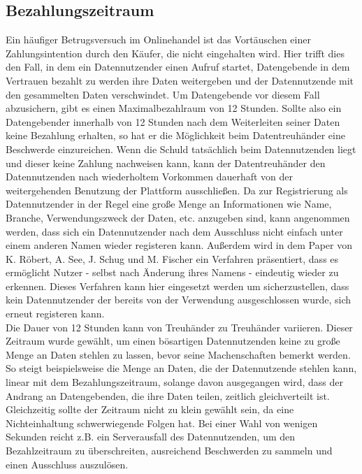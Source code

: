 \documentclass{scrreprt}
\begin{document}
\subsection{Bezahlungszeitraum}
\label{subsec:paymentTimespan}
Ein häufiger Betrugsversuch im Onlinehandel ist das Vortäuschen einer Zahlungsintention durch den Käufer, die nicht eingehalten wird. Hier trifft dies den Fall, in dem ein Datennutzender einen Aufruf startet, Datengebende in dem Vertrauen bezahlt zu werden ihre Daten weitergeben und der Datennutzende mit den gesammelten Daten verschwindet. Um Datengebende vor diesem Fall abzusichern, gibt es einen Maximalbezahlraum von 12 Stunden. Sollte also ein Datengebender innerhalb von 12 Stunden nach dem Weiterleiten seiner Daten keine Bezahlung erhalten, so hat er die Möglichkeit beim Datentreuhänder eine Beschwerde einzureichen. Wenn die Schuld tatsächlich beim Datennutzenden liegt und dieser keine Zahlung nachweisen kann, kann der Datentreuhänder den Datennutzenden nach wiederholtem Vorkommen dauerhaft von der weitergehenden Benutzung der Plattform ausschließen. Da zur Registrierung als Datennutzender in der Regel eine große Menge an Informationen wie Name, Branche, Verwendungszweck der Daten, etc. anzugeben sind, kann angenommen werden, dass sich ein Datennutzender nach dem Ausschluss nicht einfach unter einem anderen Namen wieder registeren kann. Außerdem wird in dem Paper  von K. Röbert, A. See, J. Schug und M. Fischer ein Verfahren präsentiert, dass es ermöglicht Nutzer - selbst nach Änderung ihres Namens - eindeutig wieder zu erkennen. Dieses Verfahren kann hier eingesetzt werden um sicherzustellen, dass kein Datennutzender der bereits von der Verwendung ausgeschlossen wurde, sich erneut registeren kann.\\

Die Dauer von 12 Stunden kann von Treuhänder zu Treuhänder variieren. Dieser Zeitraum wurde gewählt, um einen bösartigen Datennutzenden keine zu große Menge an Daten stehlen zu lassen, bevor seine Machenschaften bemerkt werden. So steigt beispielsweise die Menge an Daten, die der Datennutzende stehlen kann, linear mit dem Bezahlungszeitraum, solange davon ausgegangen wird, dass der Andrang an Datengebenden, die ihre Daten teilen, zeitlich gleichverteilt ist. Gleichzeitig sollte der Zeitraum nicht zu klein gewählt sein, da eine Nichteinhaltung schwerwiegende Folgen hat. Bei einer Wahl von wenigen Sekunden reicht z.B. ein Serverausfall des Datennutzenden, um den Bezahlzeitraum zu überschreiten, ausreichend Beschwerden zu sammeln und einen Ausschluss auszulösen.
\end{document}
